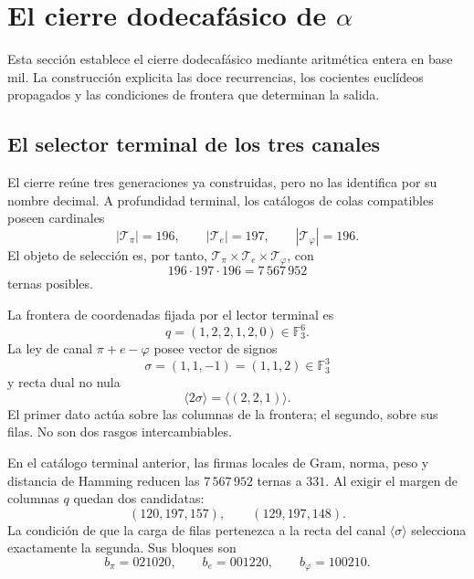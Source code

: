 \chapter{El cierre dodecafásico de \texorpdfstring{\(\alpha\)}{alpha}}
\label{chap:alpha}

Esta sección establece el cierre dodecafásico mediante aritmética entera en
base mil. La construcción explicita las doce recurrencias, los cocientes
euclídeos propagados y las condiciones de frontera que determinan la salida.

\section{El selector terminal de los tres canales}
\label{sec:selector-terminal-alpha-rev6}

El cierre reúne tres generaciones ya construidas, pero no las identifica por
su nombre decimal. A profundidad terminal, los catálogos de colas compatibles
poseen cardinales
\[
 |\mathcal T_\pi|=196,\qquad
 |\mathcal T_e|=197,\qquad
 |\mathcal T_\varphi|=196.
\]
El objeto de selección es, por tanto,
\(\mathcal T_\pi\times\mathcal T_e\times\mathcal T_\varphi\), con
\[
 196\cdot197\cdot196=7\,567\,952
\]
ternas posibles.

La frontera de coordenadas fijada por el lector terminal es
\[
 q=(1,2,2,1,2,0)\in\mathbb F_3^6.
\]
La ley de canal \(\pi+e-\varphi\) posee vector de signos
\[
 \sigma=(1,1,-1)=(1,1,2)\in\mathbb F_3^3
\]
y recta dual no nula
\[
 \langle2\sigma\rangle
 =\langle(2,2,1)\rangle.
\]
El primer dato actúa sobre las columnas de la frontera; el segundo, sobre
sus filas. No son dos rasgos intercambiables.

\begin{theorem}
\label{thm:selector-terminal-alpha-rev6}
En el catálogo terminal anterior, las firmas locales de Gram, norma, peso y
distancia de Hamming reducen las \(7\,567\,952\) ternas a \(331\). Al exigir
el margen de columnas \(q\) quedan dos candidatas:
\[
 (120,197,157),\qquad(129,197,148).
\]
La condición de que la carga de filas pertenezca a la recta del canal
\(\langle\sigma\rangle\) selecciona exactamente la segunda. Sus bloques son
\[
 \boxed{
 b_\pi=021020,\qquad
 b_e=001220,\qquad
 b_\varphi=100210.}
\]
\end{theorem}

